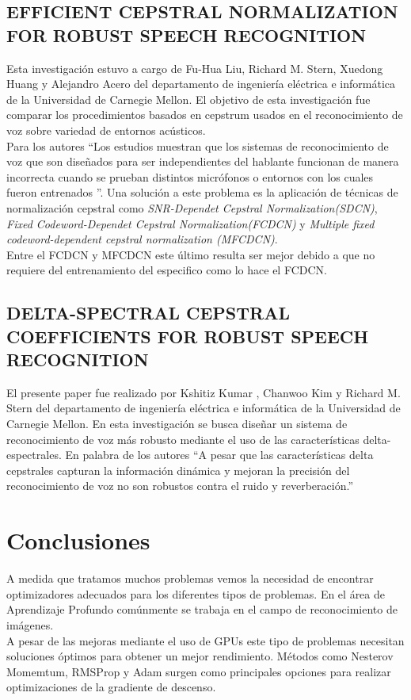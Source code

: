 \subsection{EFFICIENT CEPSTRAL NORMALIZATION FOR ROBUST SPEECH RECOGNITION}
Esta investigación estuvo a cargo de Fu-Hua Liu, Richard M. Stern, Xuedong Huang y Alejandro Acero del departamento de ingeniería eléctrica e informática de la Universidad de Carnegie Mellon. El objetivo de esta investigación fue comparar los procedimientos basados en cepstrum usados en el reconocimiento de voz sobre variedad de entornos acústicos.\\ Para los autores \textquotedblleft Los estudios muestran que los sistemas de reconocimiento de voz que son diseñados para ser independientes del hablante funcionan de manera incorrecta cuando se prueban distintos micrófonos o entornos con los cuales fueron entrenados \textquotedblright. Una solución a este problema es la aplicación de técnicas de normalización cepstral como \textit{ SNR-Dependet Cepstral Normalization(SDCN)}, \textit{Fixed Codeword-Dependet Cepstral Normalization(FCDCN)} y \textit{ Multiple fixed codeword-dependent cepstral normalization (MFCDCN)}.\\ Entre el FCDCN y MFCDCN este último resulta ser mejor debido a que no requiere del entrenamiento del especifico como lo hace el FCDCN.

\subsection{DELTA-SPECTRAL CEPSTRAL COEFFICIENTS FOR ROBUST SPEECH RECOGNITION}

El presente paper fue realizado por Kshitiz Kumar  , Chanwoo Kim y Richard M. Stern del departamento de ingeniería eléctrica e informática de la Universidad de Carnegie Mellon. En esta investigación se busca diseñar un sistema de reconocimiento de voz más robusto mediante el uso de las características delta-espectrales. En palabra de los autores \textquotedblleft A pesar que las características delta cepstrales capturan la información dinámica y mejoran la precisión del reconocimiento de voz no son robustos contra el ruido y reverberación.\textquotedblright
\section{Conclusiones}
A medida que tratamos muchos problemas vemos la necesidad de encontrar optimizadores adecuados para los diferentes tipos de problemas. En el área de Aprendizaje Profundo comúnmente se trabaja en el campo de reconocimiento de imágenes.\\ A pesar de las mejoras mediante el uso de GPUs este tipo de problemas necesitan soluciones óptimos para obtener un mejor rendimiento. Métodos como Nesterov Momemtum, RMSProp y Adam surgen como principales opciones para realizar optimizaciones de la gradiente de descenso.

